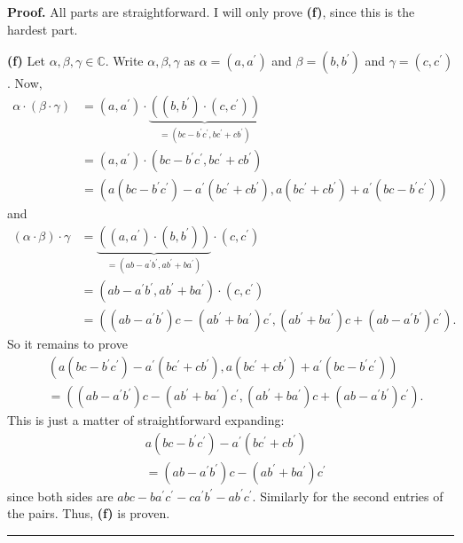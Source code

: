 \documentclass[numbers=enddot,12pt,final,onecolumn,notitlepage]{scrartcl}%
\numberwithin{exer}{subsection}
\theoremstyle{definition}
\newenvironment{proof}[1][Proof]{\noindent\textbf{#1.} }{\ \rule{0.5em}{0.5em}}
\begin{document}
\begin{proof}
All parts are straightforward. I will only prove \textbf{(f)}, since this is
the hardest part.

\textbf{(f)} Let $\alpha,\beta,\gamma\in\mathbb{C}$. Write $\alpha
,\beta,\gamma$ as $\alpha=\left(  a,a^{\prime}\right)  $ and $\beta=\left(
b,b^{\prime}\right)  $ and $\gamma=\left(  c,c^{\prime}\right)  $. Now,%
\begin{align*}
\alpha\cdot\left(  \beta\cdot\gamma\right)    & =\left(  a,a^{\prime}\right)
\cdot\underbrace{\left(  \left(  b,b^{\prime}\right)  \cdot\left(
c,c^{\prime}\right)  \right)  }_{=\left(  bc-b^{\prime}c^{\prime},bc^{\prime
}+cb^{\prime}\right)  }\\
& =\left(  a,a^{\prime}\right)  \cdot\left(  bc-b^{\prime}c^{\prime
},bc^{\prime}+cb^{\prime}\right)  \\
& =\left(  a\left(  bc-b^{\prime}c^{\prime}\right)  -a^{\prime}\left(
bc^{\prime}+cb^{\prime}\right)  ,a\left(  bc^{\prime}+cb^{\prime}\right)
+a^{\prime}\left(  bc-b^{\prime}c^{\prime}\right)  \right)
\end{align*}
and%
\begin{align*}
\left(  \alpha\cdot\beta\right)  \cdot\gamma & =\underbrace{\left(  \left(
a,a^{\prime}\right)  \cdot\left(  b,b^{\prime}\right)  \right)  }_{=\left(
ab-a^{\prime}b^{\prime},ab^{\prime}+ba^{\prime}\right)  }\cdot\left(
c,c^{\prime}\right)  \\
& =\left(  ab-a^{\prime}b^{\prime},ab^{\prime}+ba^{\prime}\right)
\cdot\left(  c,c^{\prime}\right)  \\
& =\left(  \left(  ab-a^{\prime}b^{\prime}\right)  c-\left(  ab^{\prime
}+ba^{\prime}\right)  c^{\prime},\left(  ab^{\prime}+ba^{\prime}\right)
c+\left(  ab-a^{\prime}b^{\prime}\right)  c^{\prime}\right)  .
\end{align*}
So it remains to prove%
\begin{align*}
& \left(  a\left(  bc-b^{\prime}c^{\prime}\right)  -a^{\prime}\left(
bc^{\prime}+cb^{\prime}\right)  ,a\left(  bc^{\prime}+cb^{\prime}\right)
+a^{\prime}\left(  bc-b^{\prime}c^{\prime}\right)  \right)  \\
& =\left(  \left(  ab-a^{\prime}b^{\prime}\right)  c-\left(  ab^{\prime
}+ba^{\prime}\right)  c^{\prime},\left(  ab^{\prime}+ba^{\prime}\right)
c+\left(  ab-a^{\prime}b^{\prime}\right)  c^{\prime}\right)  .
\end{align*}
This is just a matter of straightforward expanding:%
\begin{align*}
& a\left(  bc-b^{\prime}c^{\prime}\right)  -a^{\prime}\left(  bc^{\prime
}+cb^{\prime}\right)  \\
& =\left(  ab-a^{\prime}b^{\prime}\right)  c-\left(  ab^{\prime}+ba^{\prime
}\right)  c^{\prime}%
\end{align*}
since both sides are $\allowbreak abc-ba^{\prime}c^{\prime}-ca^{\prime
}b^{\prime}-ab^{\prime}c^{\prime}$. Similarly for the second entries of the
pairs. Thus, \textbf{(f)} is proven.
\end{proof}
\end{document}
